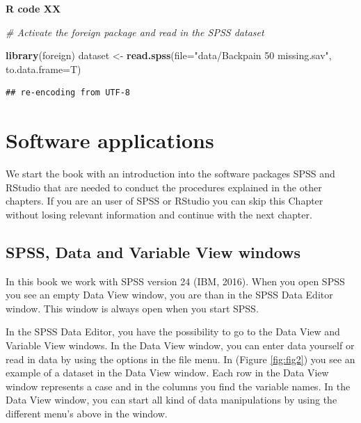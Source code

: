 \documentclass[]{book}
\newenvironment{Shaded}{\begin{snugshade}}{\end{snugshade}}
\newcommand{\KeywordTok}[1]{\textcolor[rgb]{0.13,0.29,0.53}{\textbf{#1}}}
\newcommand{\DataTypeTok}[1]{\textcolor[rgb]{0.13,0.29,0.53}{#1}}
\newcommand{\StringTok}[1]{\textcolor[rgb]{0.31,0.60,0.02}{#1}}
\newcommand{\CommentTok}[1]{\textcolor[rgb]{0.56,0.35,0.01}{\textit{#1}}}
\newcommand{\NormalTok}[1]{#1}
\theoremstyle{definition}
\theoremstyle{definition}
\theoremstyle{definition}
\theoremstyle{remark}
\begin{document}
\textbf{R code XX}

\begin{Shaded}
\begin{Highlighting}[]
\CommentTok{# Activate the foreign package and read in the SPSS dataset}

\KeywordTok{library}\NormalTok{(foreign)}
\NormalTok{dataset <-}\StringTok{ }\KeywordTok{read.spss}\NormalTok{(}\DataTypeTok{file=}\StringTok{"data/Backpain 50 missing.sav"}\NormalTok{, }\DataTypeTok{to.data.frame=}\NormalTok{T)}
\end{Highlighting}
\end{Shaded}

\begin{verbatim}
## re-encoding from UTF-8
\end{verbatim}

\chapter{Software applications}\label{software-applications}

We start the book with an introduction into the software packages SPSS
and RStudio that are needed to conduct the procedures explained in the
other chapters. If you are an user of SPSS or RStudio you can skip this
Chapter without losing relevant information and continue with the next
chapter.

\section{SPSS, Data and Variable View
windows}\label{spss-data-and-variable-view-windows}

In this book we work with SPSS version 24 (IBM, 2016). When you open
SPSS you see an empty Data View window, you are than in the SPSS Data
Editor window. This window is always open when you start SPSS.

In the SPSS Data Editor, you have the possibility to go to the Data View
and Variable View windows. In the Data View window, you can enter data
yourself or read in data by using the options in the file menu. In
(Figure \ref{fig:fig2}) you see an example of a dataset in the Data View
window. Each row in the Data View window represents a case and in the
columns you find the variable names. In the Data View window, you can
start all kind of data manipulations by using the different menu's above
in the window.
\end{document}
